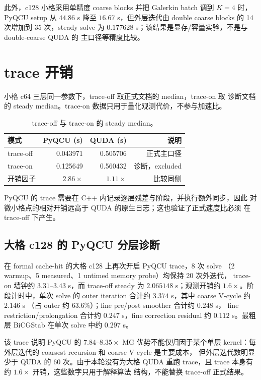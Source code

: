 \documentclass[UTF8,a4paper,11pt]{ctexart}
\begin{document}
此外，c128 小格采用单精度 coarse blocks 并把 Galerkin batch 调到
$K=4$ 时，PyQCU setup 从 $44.86$ s 降至 $16.67$ s，但外层迭代由
double coarse blocks 的 14 次增加到 35 次，steady solve 为
$0.177628$ s；该结果是显存/容量实验，不是与 double-coarse QUDA 的
主口径等精度比较。

\section{trace 开销}

小格 c64 三层同一参数下，trace-off 取正式文档的 median，trace-on 取
诊断文档的 steady median。trace-on 数据只用于量化观测代价，不参与加速比。

\begin{table}[htbp]
\centering
\small
\caption{trace-off 与 trace-on 的 steady median。}
\label{tab:trace}
\begin{tabular}{@{}L{0.25\textwidth}rrr@{}}
\toprule
模式 & PyQCU (s) & QUDA (s) & 说明 \\
\midrule
trace-off & 0.043971 & 0.505706 & 正式主口径 \\
trace-on & 0.125649 & 0.560432 & 诊断，excluded \\
开销因子 & $2.86\times$ & $1.11\times$ & 比较同侧 \\
\bottomrule
\end{tabular}
\end{table}

PyQCU 的 trace 需要在 C++ 内记录逐层残差与阶段，并执行额外同步，因此
对微小格点的相对开销远高于 QUDA 的原生日志；这也验证了正式速度比必须
在 trace-off 下产生。

\subsection{大格 c128 的 PyQCU 分层诊断}

在 formal cache-hit 的大格 c128 上再次开启 PyQCU trace，8 次 solve
（2 warmup、5 measured、1 untimed memory probe）均保持 20 次外迭代，
trace-on 墙钟约 $3.31$--$3.43$ s，而 trace-off steady 为
$2.065148$ s；观测开销约 $1.6\times$。阶段计时中，单次 solve 的
outer iteration 合计约 $3.374$ s，其中 coarse V-cycle 约 $2.146$ s
（占 outer 约 $63.6\%$）；fine pre/post smoother 合计约 $0.248$ s，
fine restriction/prolongation 合计约 $0.247$ s，fine correction
residual 约 $0.112$ s。最粗层 BiCGStab 在单次 solve 中约 $0.297$ s。

该 trace 说明 PyQCU 的 $7.84$--$8.35\times$ MG 优势不能仅归因于某个单层
kernel：每外层迭代的 coarsest recursion 和 coarse V-cycle 是主要成本，
但外层迭代数明显少于 QUDA 的 60 次。由于本轮没有为大格 QUDA 重跑
trace，且 trace 本身有约 $1.6\times$ 开销，这些数字只用于解释算法
结构，不能替换 trace-off 正式结果。
\end{document}

